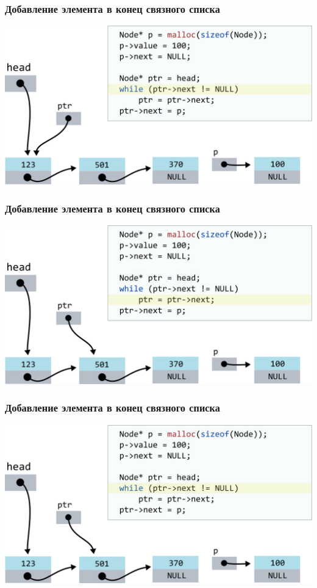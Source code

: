 \documentclass[10pt,pdf,hyperref={unicode}]{beamer}
\begin{document}
\begin{frame}[fragile]
\frametitle{Добавление элемента в конец связного списка}
\begin{center}
\includegraphics[width=\imageSizeMult\linewidth]{../images/codelist/codelistf_insert6.png}
\end{center}
\end{frame}



\begin{frame}[fragile]
\frametitle{Добавление элемента в конец связного списка}
\begin{center}
\includegraphics[width=\imageSizeMult\linewidth]{../images/codelist/codelistf_insert7.png}
\end{center}
\end{frame}



\begin{frame}[fragile]
\frametitle{Добавление элемента в конец связного списка}
\begin{center}
\includegraphics[width=\imageSizeMult\linewidth]{../images/codelist/codelistf_insert8.png}
\end{center}
\end{frame}
\end{document}
